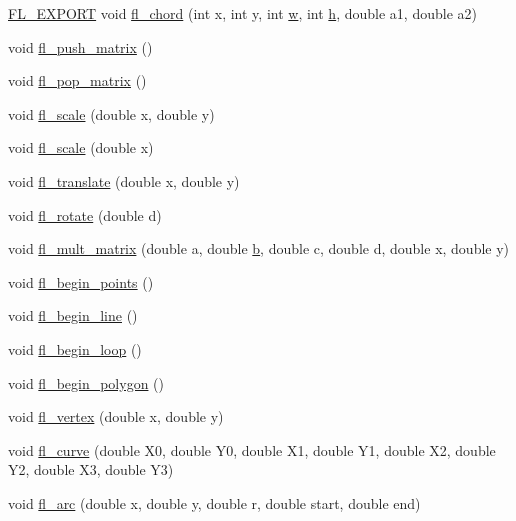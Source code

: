 \begin{DoxyCompactItemize}
\item 
\hyperlink{_fl___export_8_h_aa9ba29a18aee9d738370a06eeb4470fc}{F\+L\+\_\+\+E\+X\+P\+O\+RT} void \hyperlink{group__fl__drawings_ga607deaaf470293e97c2548266ea73e43}{fl\+\_\+chord} (int x, int y, int \hyperlink{forms_8_h_aac374e320caaadeca4874add33b62af2}{w}, int \hyperlink{forms_8_h_a7e427ba5b307f9068129699250690066}{h}, double a1, double a2)
\item 
void \hyperlink{group__fl__drawings_gac6aa24b9ddc4d79a2e357ea812563a91}{fl\+\_\+push\+\_\+matrix} ()
\item 
void \hyperlink{group__fl__drawings_gab002201c2d4dfd87f82c3bd039d92ecc}{fl\+\_\+pop\+\_\+matrix} ()
\item 
void \hyperlink{group__fl__drawings_ga60522372d52422ab427d540d375a43ad}{fl\+\_\+scale} (double x, double y)
\item 
void \hyperlink{group__fl__drawings_ga055ef231c1621acbd571c12b995676f0}{fl\+\_\+scale} (double x)
\item 
void \hyperlink{group__fl__drawings_ga319d6ba89d8a5a0b375dfbef4f265cd0}{fl\+\_\+translate} (double x, double y)
\item 
void \hyperlink{group__fl__drawings_gab2a13525800bed49c0154562d523717f}{fl\+\_\+rotate} (double d)
\item 
void \hyperlink{group__fl__drawings_gab9c6ee4a256e888f7a8af0365f40b515}{fl\+\_\+mult\+\_\+matrix} (double a, double \hyperlink{forms_8_h_a0ba06a290a384fa06b1b90745827dae2}{b}, double c, double d, double x, double y)
\item 
void \hyperlink{group__fl__drawings_ga35cac1d422bd2a1c713e0119407086b1}{fl\+\_\+begin\+\_\+points} ()
\item 
void \hyperlink{group__fl__drawings_gae6a88cd889c957813dc6dc849876b532}{fl\+\_\+begin\+\_\+line} ()
\item 
void \hyperlink{group__fl__drawings_ga3cac8693d88eeec879f909ba03007686}{fl\+\_\+begin\+\_\+loop} ()
\item 
void \hyperlink{group__fl__drawings_ga63b2b306812f12741f271b469e192a8e}{fl\+\_\+begin\+\_\+polygon} ()
\item 
void \hyperlink{group__fl__drawings_ga1201f6cfa1422ac8f508bfaccbe497b3}{fl\+\_\+vertex} (double x, double y)
\item 
void \hyperlink{group__fl__drawings_ga4c5bf16603ecea25acdf2d86d43580a5}{fl\+\_\+curve} (double X0, double Y0, double X1, double Y1, double X2, double Y2, double X3, double Y3)
\item 
void \hyperlink{group__fl__drawings_ga55e75228acb8f4c0febbc72fc9ab50dd}{fl\+\_\+arc} (double x, double y, double r, double start, double end)

\end{DoxyCompactItemize}
